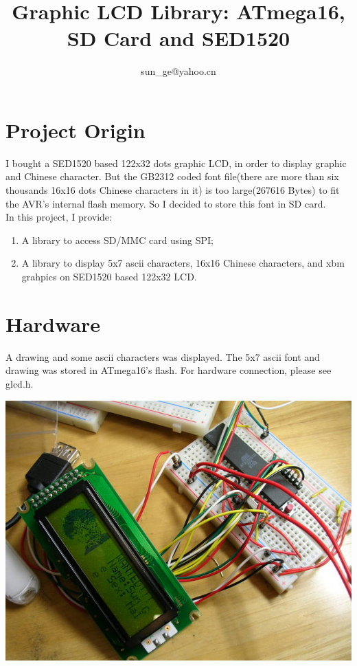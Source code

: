 \documentclass[11pt,a4paper]{article}
\title{Graphic LCD Library: ATmega16, SD Card and SED1520}
\author{sun\_ge@yahoo.cn}
\begin{document}
\maketitle

\section{Project Origin}
I bought a SED1520 based 122x32 dots graphic LCD, in order to display graphic and
Chinese character. But the GB2312 coded font file(there are more than six thousands
16x16 dots Chinese characters in it) is too large(267616 Bytes) to fit the AVR's internal flash
memory. So I decided to store this font in SD card.\\
In this project, I provide:
\begin{enumerate}
\item A library to access SD/MMC card using SPI;
\item A library to display 5x7 ascii characters, 16x16 Chinese characters, and xbm grahpics
on SED1520 based 122x32 LCD.
\end{enumerate}

\section{Hardware}

A drawing and some ascii characters was displayed. The 5x7 ascii font and drawing
was stored in ATmega16's flash. For hardware connection, please see glcd.h.\\
\begin{center}
\includegraphics[scale=0.9]{glcd-sd-1.jpg}
\end{center}
\end{document}
